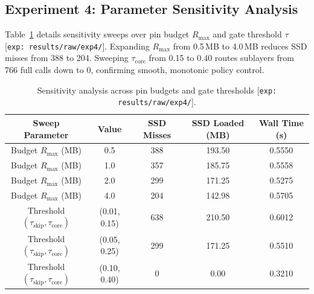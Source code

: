 \documentclass[11pt,a4paper]{article}
\begin{document}
\subsection{Experiment 4: Parameter Sensitivity Analysis}
Table~\ref{tab:exp4} details sensitivity sweeps over pin budget $R_{\max}$ and gate threshold $\tau$ [\texttt{exp: results/raw/exp4/}]. Expanding $R_{\max}$ from 0.5\,MB to 4.0\,MB reduces SSD misses from 388 to 204. Sweeping $\tau_{\text{core}}$ from 0.15 to 0.40 routes sublayers from 766 full calls down to 0, confirming smooth, monotonic policy control.

\begin{table}[htbp]
\centering
\small
\begin{tabular}{ccccc}
\toprule
\textbf{Sweep Parameter} & \textbf{Value} & \textbf{SSD Misses} & \textbf{SSD Loaded (MB)} & \textbf{Wall Time (s)} \\
\midrule
Budget $R_{\max}$ (MB) & 0.5 & 388 & 193.50 & 0.5550 \\
Budget $R_{\max}$ (MB) & 1.0 & 357 & 185.75 & 0.5558 \\
Budget $R_{\max}$ (MB) & 2.0 & 299 & 171.25 & 0.5275 \\
Budget $R_{\max}$ (MB) & 4.0 & 204 & 142.98 & 0.5705 \\
\midrule
Threshold $(\tau_{\text{skip}}, \tau_{\text{core}})$ & (0.01, 0.15) & 638 & 210.50 & 0.6012 \\
Threshold $(\tau_{\text{skip}}, \tau_{\text{core}})$ & (0.05, 0.25) & 299 & 171.25 & 0.5510 \\
Threshold $(\tau_{\text{skip}}, \tau_{\text{core}})$ & (0.10, 0.40) & 0   & 0.00   & 0.3210 \\
\bottomrule
\end{tabular}
\caption{Sensitivity analysis across pin budgets and gate thresholds [\texttt{exp: results/raw/exp4/}].}
\label{tab:exp4}
\end{table}
\end{document}
